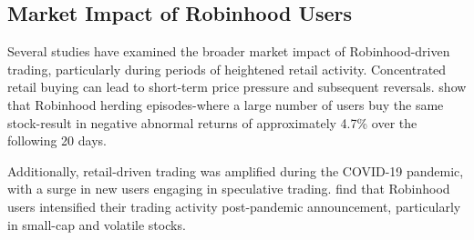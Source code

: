 \subsection{Market Impact of Robinhood Users}
Several studies have examined the broader market impact of Robinhood-driven trading, particularly during periods of heightened retail activity. Concentrated retail buying can lead to short-term price pressure and subsequent reversals. \cite{barber2021robinhood} show that Robinhood herding episodes-where a large number of users buy the same stock-result in negative abnormal returns of approximately 4.7\% over the following 20 days. 

Additionally, retail-driven trading was amplified during the COVID-19 pandemic, with a surge in new users engaging in speculative trading. \cite{Ardia2023Fast} find that Robinhood users intensified their trading activity post-pandemic announcement, particularly in small-cap and volatile stocks. 


